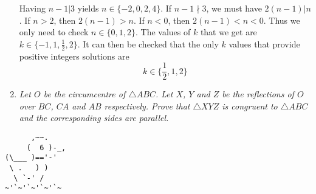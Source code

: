 \documentclass{article}
\begin{document}
\begin{enumerate}[1.]
Having $n - 1 | 3$ yields $n \in \{-2, 0, 2, 4\}$. If $n - 1 \nmid 3$, we must have $2(n - 1) | n$. If $n > 2$, then $2(n - 1) > n$. If $n < 0$, then $2(n - 1) < n < 0$. Thus we only need to check $n \in \{0, 1, 2\}$. The values of $k$ that we get are $k \in \{-1, 1, \frac{1}{2}, 2\}$. It can then be checked that the only $k$ values that provide positive integers solutions are 
$$k \in \{\frac{1}{2}, 1, 2\}$$

\item %
{\itshape Let $O$ be the circumcentre of $\triangle ABC$. Let $X$, $Y$ and $Z$ be the reflections of $O$ over $BC$, $CA$ and $AB$ respectively. Prove that $\triangle XYZ$ is congruent to $\triangle ABC$ and the corresponding sides are parallel.}


\end{enumerate}


\vfill
\centering
\begin{BVerbatim}
      ,~~.
     (  6 )-_,
(\___ )=='-'
 \ .   ) )
  \ `-' /    
~'`~'`~'`~'`~
\end{BVerbatim}
\end{document}
